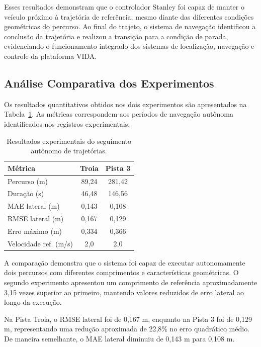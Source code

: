 Esses resultados demonstram que o controlador Stanley foi capaz de manter o veículo próximo à trajetória de referência, mesmo diante das diferentes condições geométricas do percurso. Ao final do trajeto, o sistema de navegação identificou a conclusão da trajetória e realizou a transição para a condição de parada, evidenciando o funcionamento integrado dos sistemas de localização, navegação e controle da plataforma VIDA.

\subsection{Análise Comparativa dos Experimentos}

Os resultados quantitativos obtidos nos dois experimentos são apresentados na Tabela~\ref{tab:resultados_seguimento}. As métricas correspondem aos períodos de navegação autônoma identificados nos registros experimentais.

\begin{table}[htb]
    \centering
    \caption{Resultados experimentais do seguimento autônomo de trajetórias.}
    \label{tab:resultados_seguimento}
    \begin{tabular}{lcc}
        \hline
        \textbf{Métrica} & \textbf{Troia} & \textbf{Pista 3} \\
        \hline
        Percurso (m) & 89,24 & 281,42 \\
        Duração (s) & 46,48 & 146,56 \\
        MAE lateral (m) & 0,143 & 0,108 \\
        RMSE lateral (m) & 0,167 & 0,129 \\
        Erro máximo (m) & 0,334 & 0,366 \\
        Velocidade ref. (m/s) & 2,0 & 2,0 \\
        \hline
    \end{tabular}
\end{table}

A comparação demonstra que o sistema foi capaz de executar autonomamente dois percursos com diferentes comprimentos e características geométricas. O segundo experimento apresentou um comprimento de referência aproximadamente 3,15 vezes superior ao primeiro, mantendo valores reduzidos de erro lateral ao longo da execução.

Na Pista Troia, o RMSE lateral foi de 0,167 m, enquanto na Pista 3 foi de 0,129 m, representando uma redução aproximada de 22,8\% no erro quadrático médio. De maneira semelhante, o MAE lateral diminuiu de 0,143 m para 0,108 m.

